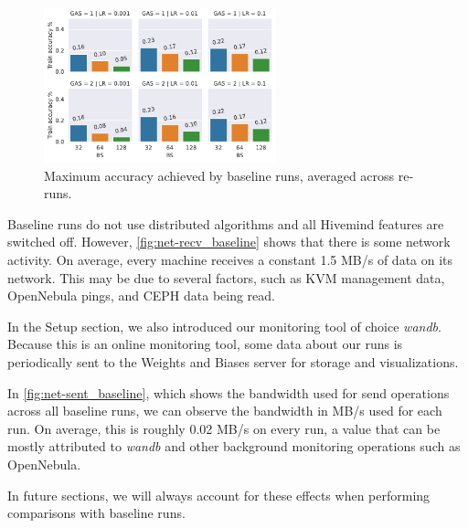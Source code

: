 \begin{figure}[ht]
    \centering
    \includegraphics[width=0.6\textwidth]{./figures/06_barplot-losses_baseline-16vCPUs-GAS-1.pdf}
    \caption{Maximum accuracy achieved by baseline runs, averaged across re-runs.}
    \label{fig:baseline-losses}
\end{figure}

Baseline runs do not use distributed algorithms and all Hivemind features are switched off.
However, \autoref{fig:net-recv_baseline} shows that there is some network activity.
On average, every machine receives a constant 1.5 MB/s of data on its network.
This may be due to several factors, such as KVM management data, OpenNebula pings, and CEPH data being read.

In the Setup section, we also introduced our monitoring tool of choice \textit{wandb}.
Because this is an online monitoring tool, some data about our runs is periodically sent to the Weights and Biases server for storage and visualizations.

In \autoref{fig:net-sent_baseline}, which shows the bandwidth used for send operations across all baseline runs, we can observe the bandwidth in MB/s used for each run.
On average, this is roughly 0.02 MB/s on every run, a value that can be mostly attributed to \textit{wandb} and other background monitoring operations such as OpenNebula.

In future sections, we will always account for these effects when performing comparisons with baseline runs.

